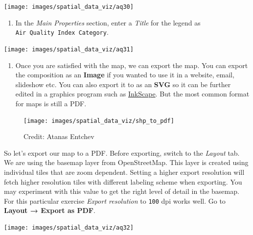 \documentclass[
  12pt,
  a4paper]{article}
\providecommand{\tightlist}{%
  \setlength{\itemsep}{0pt}\setlength{\parskip}{0pt}}
\begin{document}
\begin{center}\texttt{[image: images/spatial\_data\_viz/aq30]} \end{center}

\begin{enumerate}
\def\labelenumi{\arabic{enumi}.}
\setcounter{enumi}{30}
\tightlist
\item
  In the \emph{Main Properties} section, enter a \emph{Title} for the
  legend as \texttt{Air\ Quality\ Index\ Category}.
\end{enumerate}

\begin{center}\texttt{[image: images/spatial\_data\_viz/aq31]} \end{center}

\begin{enumerate}
\def\labelenumi{\arabic{enumi}.}
\setcounter{enumi}{31}
\tightlist
\item
  Once you are satisfied with the map, we can export the map. You can
  export the composition as an \textbf{Image} if you wanted to use it in
  a website, email, slideshow etc. You can also export it to as an
  \textbf{SVG} so it can be further edited in a graphics program such as
  \href{https://inkscape.org/}{InkScape}. But the most common format for
  maps is still a PDF.
\end{enumerate}

\begin{figure}

{\centering \texttt{[image: images/spatial\_data\_viz/shp\_to\_pdf]} 

}

\caption{Credit: Atanas Entchev}\label{fig:unnamed-chunk-39}
\end{figure}

So let's export our map to a PDF. Before exporting, switch to the
\emph{Layout} tab. We are using the basemap layer from OpenStreetMap.
This layer is created using individual tiles that are zoom dependent.
Setting a higher export resolution will fetch higher resolution tiles
with different labeling scheme when exporting. You may experiment with
this value to get the right level of detail in the basemap. For this
particular exercise \emph{Export resolution} to \texttt{100} dpi works
well. Go to \textbf{Layout → Export as PDF}.

\begin{center}\texttt{[image: images/spatial\_data\_viz/aq32]} \end{center}
\end{document}
